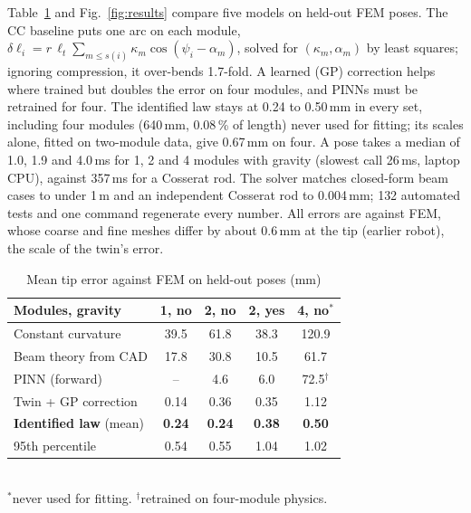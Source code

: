 \documentclass[conference]{IEEEtran}
\begin{document}
Table~\ref{tab:results} and Fig.~\ref{fig:results} compare five models on held-out FEM poses. The CC baseline puts one
arc on each module, $\delta\ell_i=r\,\ell_t\sum_{m\le s(i)}\kappa_m\cos(\psi_i-\alpha_m)$, solved for $(\kappa_m,
\alpha_m)$ by least squares; ignoring compression, it over-bends 1.7-fold. A learned (GP) correction helps where trained
but doubles the error on four modules, and PINNs must be retrained for four. The identified law stays at 0.24 to
0.50\,mm in every set, including four modules (640\,mm, 0.08\,\% of length) never used for fitting; its scales alone,
fitted on two-module data, give 0.67\,mm on four. A pose takes a median of 1.0, 1.9 and 4.0\,ms for 1, 2 and 4 modules with gravity (slowest call 26\,ms, laptop
CPU), against 357\,ms for a Cosserat rod. The solver matches closed-form beam cases to under 1\,\textmu m and an
independent Cosserat rod to 0.004\,mm; 132 automated tests and one command regenerate every number. All errors are
against FEM, whose coarse and fine meshes differ by about 0.6\,mm at the tip (earlier robot), the scale of the twin's
error.

\begin{table}[t]
\caption{Mean tip error against FEM on held-out poses (mm)}
\label{tab:results}
\centering\footnotesize
\setlength{\tabcolsep}{3.2pt}
\begin{tabular}{@{}lcccc@{}}
\toprule
Modules, gravity & 1, no & 2, no & 2, yes & 4, no$^*$\\
\midrule
Constant curvature & 39.5 & 61.8 & 38.3 & 120.9\\
Beam theory from CAD & 17.8 & 30.8 & 10.5 & 61.7\\
PINN (forward) & -- & 4.6 & 6.0 & 72.5$^\dagger$\\
Twin + GP correction & 0.14 & 0.36 & 0.35 & 1.12\\
\textbf{Identified law} (mean) & \textbf{0.24} & \textbf{0.24} & \textbf{0.38} & \textbf{0.50}\\
\quad 95th percentile & 0.54 & 0.55 & 1.04 & 1.02\\
\bottomrule
\end{tabular}\\[2pt]
{\scriptsize $^*$never used for fitting. $^\dagger$retrained on four-module physics.}
\end{table}

\end{document}
